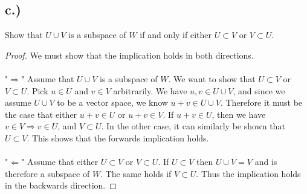 \documentclass{article}
\begin{document}
	\subsection*{c.)}
	Show that $U \cup V$ is a subspace of $W$ if and only if either $U \subset V$ or $V \subset U$.
	
	\begin{proof}
	We must show that the implication holds in both directions. \\\\
	"$\Rightarrow$" Assume that $U \cup V$ is a subspace of $W$. We want to show that $U \subset V$ or $V \subset U$. Pick $u \in U$ and $v \in V$ arbitrarily. We have $u,v \in U \cup V$, and since we assume $U \cup V$ to be a vector space, we know $u + v \in U \cup V$. Therefore it must be the case that either $u + v \in U$ or $u + v \in V$. If $u + v \in U$, then we have $v \in V \Longrightarrow v \in U$, and $V \subset U$. In the other case, it can similarly be shown that $U \subset V$. This shows that the forwards implication holds. \\\\
	"$\Leftarrow$" Assume that either $U \subset V$ or $V \subset U$. If $U \subset V$ then $U \cup V = V$ and is therefore a subspace of $W$. The same holds if $V \subset U$. Thus the implication holds in the backwards direction.
	
	\end{proof}
	
\end{document}
